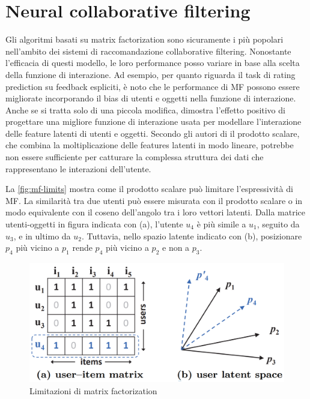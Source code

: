 \documentclass[12pt,italian]{report}
\begin{document}
\section{Neural collaborative filtering}
Gli algoritmi basati su matrix factorization sono sicuramente i più popolari nell'ambito dei sistemi di raccomandazione collaborative filtering. Nonostante l'efficacia di questi modello, le loro performance  posso variare in base alla scelta della funzione di interazione. Ad esempio, per quanto riguarda il task di rating prediction su feedback espliciti, è noto che le performance di MF possono essere migliorate incorporando il bias di utenti e oggetti nella funzione di interazione. Anche se si tratta solo di una piccola modifica, dimostra l'effetto positivo di progettare una migliore funzione di interazione usata per modellare l'interazione delle feature latenti di utenti e oggetti. 
Secondo gli autori di \cite{NCF} il prodotto scalare, che combina la moltiplicazione delle features latenti in modo lineare, potrebbe non essere sufficiente per catturare la complessa struttura dei dati che rappresentano le interazioni dell'utente. 

La \autoref{fig:mf-limits} mostra come il prodotto scalare può limitare l'espressività di MF. La similarità tra due utenti può essere misurata con il prodotto scalare o in modo equivalente con il coseno dell'angolo tra i loro vettori latenti. Dalla matrice utenti-oggetti in figura indicata con (a), l'utente $u_4$ è più simile a $u_1$, seguito da $u_3$, e in ultimo da $u_2$. Tuttavia, nello spazio latente indicato con (b), posizionare $p_4$ più vicino a $p_1$ rende $p_4$ più vicino a $p_2$ e non a $p_3$.

\begin{figure}
  \includegraphics[width=\linewidth]{immagini/user_item_vectors.png}
  \caption{Limitazioni di matrix factorization}
  \label{fig:mf-limits}
\end{figure}
\end{document}

